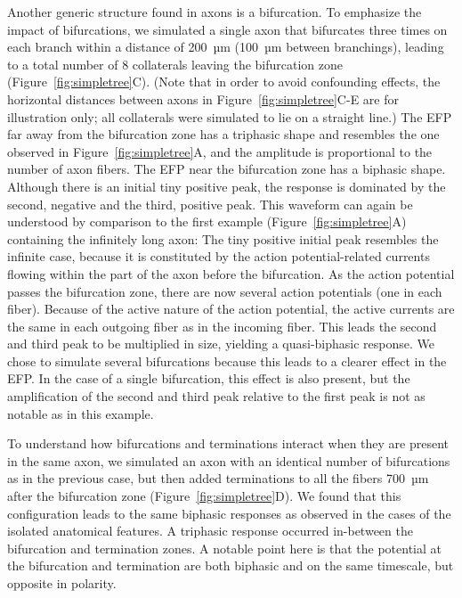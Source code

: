 \documentclass[]{elife}
\begin{document}
Another generic structure found in axons is a bifurcation. To emphasize
the impact of bifurcations, we simulated a single axon that bifurcates
three times on each branch within a distance of 200~µm (100~µm between
branchings), leading to a total number of 8 collaterals leaving the
bifurcation zone (Figure~\ref{fig:simpletree}C). (Note that in order to
avoid confounding effects, the horizontal distances between axons in
Figure~\ref{fig:simpletree}C-E are for illustration only; all
collaterals were simulated to lie on a straight line.) The EFP far away
from the bifurcation zone has a triphasic shape and resembles the one
observed in Figure~\ref{fig:simpletree}A, and the amplitude is
proportional to the number of axon fibers. The EFP near the bifurcation
zone has a biphasic shape. Although there is an initial tiny positive
peak, the response is dominated by the second, negative and the third,
positive peak. This waveform can again be understood by comparison to
the first example (Figure~\ref{fig:simpletree}A) containing the
infinitely long axon: The tiny positive initial peak resembles the
infinite case, because it is constituted by the action potential-related
currents flowing within the part of the axon before the bifurcation. As
the action potential passes the bifurcation zone, there are now several
action potentials (one in each fiber). Because of the active nature of
the action potential, the active currents are the same in each outgoing
fiber as in the incoming fiber. This leads the second and third peak to
be multiplied in size, yielding a quasi-biphasic response. We chose to
simulate several bifurcations because this leads to a clearer effect in
the EFP. In the case of a single bifurcation, this effect is also
present, but the amplification of the second and third peak relative to
the first peak is not as notable as in this example.

To understand how bifurcations and terminations interact when they are
present in the same axon, we simulated an axon with an identical number
of bifurcations as in the previous case, but then added terminations to
all the fibers 700~µm after the bifurcation zone
(Figure~\ref{fig:simpletree}D). We found that this configuration leads
to the same biphasic responses as observed in the cases of the isolated
anatomical features. A triphasic response occurred in-between the
bifurcation and termination zones. A notable point here is that the
potential at the bifurcation and termination are both biphasic and on
the same timescale, but opposite in polarity.
\end{document}
